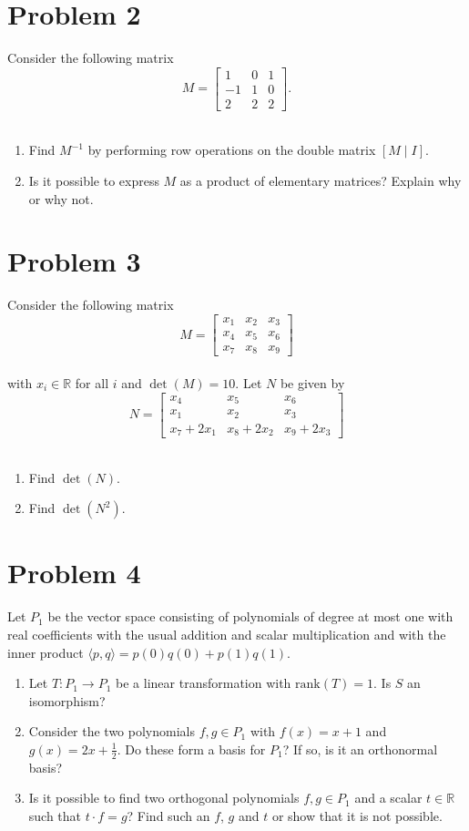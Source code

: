 \documentclass[a4paper,10pt]{article}
\def\R{\mathbb R}
\begin{document}
\section*{Problem 2}
Consider the following matrix
$$
M=\left[ \begin{array}{ccc} 1 & 0 & 1 \\ -1 & 1 & 0 \\ 2 & 2 & 2 \end{array} \right].
$$ \\
\noindent
\begin{enumerate}
\item Find $M^{-1}$ by performing row operations on the double
matrix $[M\; | \;I]$.
\item Is it possible to express $M$ as a product of elementary matrices? Explain why or why not.
\end{enumerate}



\section*{Problem 3}
Consider the following matrix
$$
M=\left[ \begin{array}{ccc} x_1 & x_2 & x_3 \\ x_4 & x_5 & x_6 \\ x_7 & x_8 & x_9  \end{array} \right]
$$ \\
with $x_i \in \R$ for all $i$ and $\det(M)=10$.
Let $N$ be given by
$$
N=\left[ \begin{array}{ccc} x_4 & x_5 & x_6 \\ x_1 & x_2 & x_3 \\ x_7+2x_1 & x_8+2x_2 & x_9+2x_3  \end{array} \right]
$$ \\
\begin{enumerate}
\item Find $\det(N)$.
\item Find $\det(N^2)$.
\end{enumerate}



\section*{Problem 4}
Let $P_1$ be the vector space consisting of polynomials of degree at most one with real coefficients with
the usual addition and scalar multiplication and with the inner product $\langle p,q\rangle=p(0)q(0)+p(1)q(1)$.
\begin{enumerate}
\item Let $T: P_1 \to P_1$ be a linear transformation with $\text{rank}(T)=1$.
Is $S$ an isomorphism?
\item Consider the two polynomials $f,g \in P_1$ with $f(x)=x+1$ and $g(x)=2x+\frac12$.
Do these form a basis for $P_1$? If so, is it an orthonormal basis?
\item Is it possible to find two orthogonal polynomials $f,g\in P_1$ and a scalar $t\in \R$ such that 
$t \cdot f=g$? Find such an $f$, $g$ and $t$ or show that it is not possible.
\end{enumerate}
\end{document}
